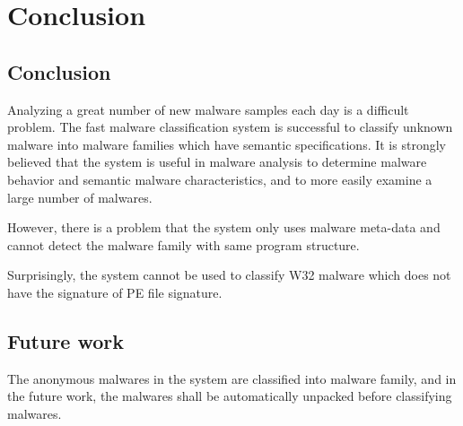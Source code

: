 
\chapter{Conclusion}\label{chap:7}
\section{Conclusion}
Analyzing a great number of new malware samples each day is a difficult problem. The fast malware classification system is successful to classify unknown malware into malware families which have semantic specifications. It is strongly believed that the system is useful in malware analysis to determine malware behavior and semantic malware characteristics, and to more easily examine a large number of malwares.

However, there is a problem that the system only uses malware meta-data and cannot detect the malware family with same program structure.

Surprisingly, the system cannot be used to classify W32 malware which does not have the signature of PE file signature. 

\section{Future work}
The anonymous malwares in the system are classified into malware family, and in the future work, the malwares shall be automatically unpacked before classifying malwares.

